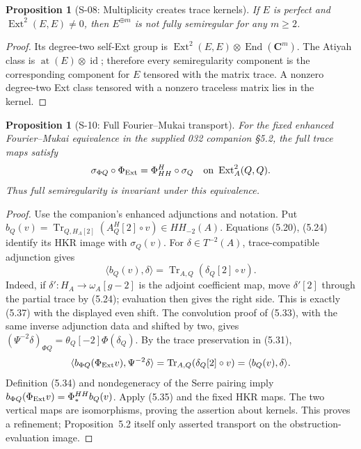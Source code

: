 \documentclass[11pt,a4paper]{article}
\newtheorem{proposition}[theorem]{Proposition}
\theoremstyle{definition}
\begin{document}
\begin{proposition}[S-08: Multiplicity creates trace kernels]
\label{prop:semireg-multiplicity}
If $E$ is perfect and $\operatorname{Ext}^2(E,E)\ne0$, then
$E^{\oplus m}$ is not fully semiregular for any $m\geq2$.
\end{proposition}
\begin{proof}
Its degree-two self-Ext group is
$\operatorname{Ext}^2(E,E)\otimes\operatorname{End}(\mathbf C^m)$.
The Atiyah class is $\operatorname{at}(E)\otimes\operatorname{id}$;
therefore every semiregularity component is the corresponding
component for $E$ tensored with the matrix trace.
A nonzero degree-two Ext class tensored with a nonzero traceless
matrix lies in the kernel.
\end{proof}

\begin{proposition}[S-10: Full Fourier--Mukai transport]
\label{prop:semireg-full-fm}
For the fixed enhanced Fourier--Mukai equivalence in the supplied
032 companion \S5.2, the full trace maps satisfy
\[
 \sigma_{\Phi Q}\circ\Phi_{\rm Ext}
   =\Phi^H_{HH}\circ\sigma_Q
 \quad\hbox{on }\operatorname{Ext}^2_A(Q,Q).
\]
Thus full semiregularity is invariant under this equivalence.
\end{proposition}
\begin{proof}
Use the companion's enhanced adjunctions and notation.
Put
$b_Q(v)=\operatorname{Tr}_{Q,H_A[2]}(A_Q^H[2]\circ v)
\in HH_{-2}(A)$.
Equations (5.20), (5.24) identify its HKR image with $\sigma_Q(v)$.
For $\delta\in T^{-2}(A)$, trace-compatible adjunction gives
\[
 \langle b_Q(v),\delta\rangle
   =\operatorname{Tr}_{A,Q}(\delta_Q[2]\circ v).
\]
Indeed, if $\delta':H_A\to\omega_A[g-2]$ is the adjoint coefficient
map, move $\delta'[2]$ through the partial trace by (5.24);
evaluation then gives the right side. This is exactly (5.37)
with the displayed even shift.
The convolution proof of (5.33), with the same inverse adjunction
data and shifted by two, gives
$(\Psi^{-2}\delta)_{\Phi Q}=\theta_Q[-2]\Phi(\delta_Q)$.
By the trace preservation in (5.31),
\[
 \langle b_{\Phi Q}(\Phi_{\rm Ext}v),\Psi^{-2}\delta\rangle
  =\operatorname{Tr}_{A,Q}(\delta_Q[2]\circ v)
  =\langle b_Q(v),\delta\rangle.
\]
Definition (5.34) and nondegeneracy of the Serre pairing imply
$b_{\Phi Q}(\Phi_{\rm Ext}v)=\Phi_*^{HH}b_Q(v)$.
Apply (5.35) and the fixed HKR maps. The two vertical maps
are isomorphisms, proving the assertion about kernels.
This proves a refinement; Proposition~5.2 itself only asserted
transport on the obstruction-evaluation image.
\end{proof}
\end{document}

